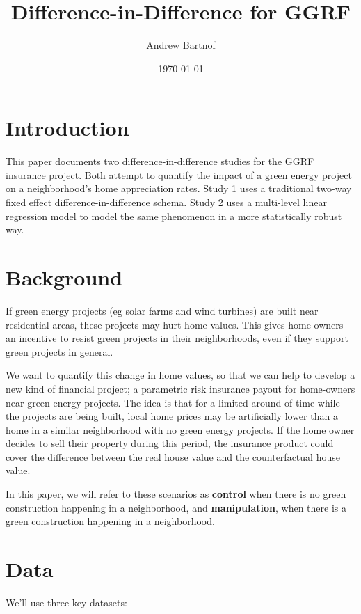 \documentclass{article}
\begin{document}
\author{Andrew Bartnof}
\title{Difference-in-Difference for GGRF}
\date{\today}
\maketitle

\section{Introduction}

This paper documents two difference-in-difference studies for the GGRF insurance project.
Both attempt to quantify the impact of a green energy project on a neighborhood's home appreciation rates.
Study 1 uses a traditional two-way fixed effect difference-in-difference schema.
Study 2 uses a multi-level linear regression model to model the same phenomenon in a more statistically robust way.

\section{Background}

If green energy projects (eg solar farms and wind turbines) are built near residential areas, these projects may hurt home values.
This gives home-owners an incentive to resist green projects in their neighborhoods, even if they support green projects in general.

We want to quantify this change in home values, so that we can help to develop a new kind of financial project; a parametric risk insurance payout for home-owners near green energy projects.
The idea is that for a limited around of time while the projects are being built, local home prices may be artificially lower than a home in a similar neighborhood with no green energy projects.
If the home owner decides to sell their property during this period, the insurance product could cover the difference between the real house value and the counterfactual house value.

In this paper, we will refer to these scenarios as \textbf{control} when there is no green construction happening in a neighborhood, and \textbf{manipulation}, when there is a green construction happening in a neighborhood.

\section{Data}

We'll use three key datasets:
\end{document}
